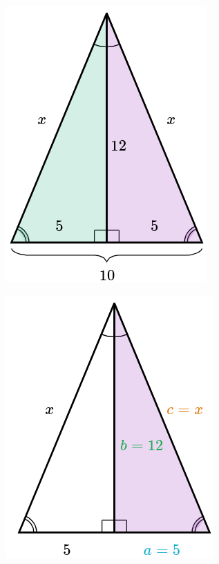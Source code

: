\begin{solutionbox}{15cm}
    \begin{minipage}{0.35\textwidth}
        \begin{figure}[H]
            \centering
            \includegraphics[width=0.7\linewidth]{../images/pitagoras11a.png}
            \caption{}
            \label{fig:pitagoras11a}
        \end{figure}
        \begin{figure}[H]
            \centering
            \includegraphics[width=0.7\linewidth]{../images/pitagoras11b.png}

\end{figure}
\end{minipage}
\end{solutionbox}
